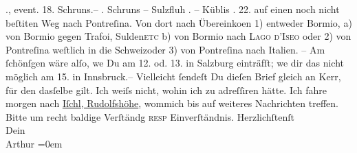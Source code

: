 \begin{ledgroupsized}[t]{13cm}
           ., event. 18. Schruns.–\pend
           . Schruns – Sulzfluh\pend
           . \hspace*{4.5em}– Küblis\pend
           . 22. auf einen noch nicht beſti{\geminationm}ten Weg nach Pontreſina. \pend
           \pstart
           Von dort nach Übereinko{\geminationm}en \introOben{}1)\introOben{}
               entweder Bormio, \introOben{}a)\introOben{}
               von Bormio gegen Trafoi, Sulden\textsc{etc} b) von Bormio
               nach \textsc{Lago d’Iseo} oder 2) von Pontreſina weſtlich in die
                  Schweizoder 3) von Pontreſina nach Italien. – Am ſchönſgen wäre alſo, we{\geminationn} Du am 12. od. 13. in Salzburg einträfſt; we{\geminationn} dir das nicht möglich
               am 15. in Innsbruck.– \pend
           \pstart
           Vielleicht ſendeſt Du dieſen Brief gleich an Kerr, für den dasſelbe gilt. Ich weiſs nicht, wohin ich zu adreſſiren hätte.
                  {\pb}\pend
           \pstart
           Ich fahre morgen nach \uline{Iſchl, Rudolfshöhe}, wommich bis auf weiteres Nachrichten treffen. Bitte um recht baldige Verſtändg
                  \textsc{resp} Einverſtändnis.\pend
           \pstart
           Herzlichſtenſt{\\[\baselineskip]}Dein{\\[\baselineskip]}\spacefill\mbox{Arthur}\pend
           \leftskip=0em{}
         
         \endnumbering{}\end{ledgroupsized}\begin{anhang}\end{anhang}\newcommand{\dateiname}{L03176}\newcommand{\titel}{Arthur Schnitzler an Paul Goldmann, 30. 7. 1900}\newcommand{\editorInnen}{Martin Anton Müller und Laura Untner}
      